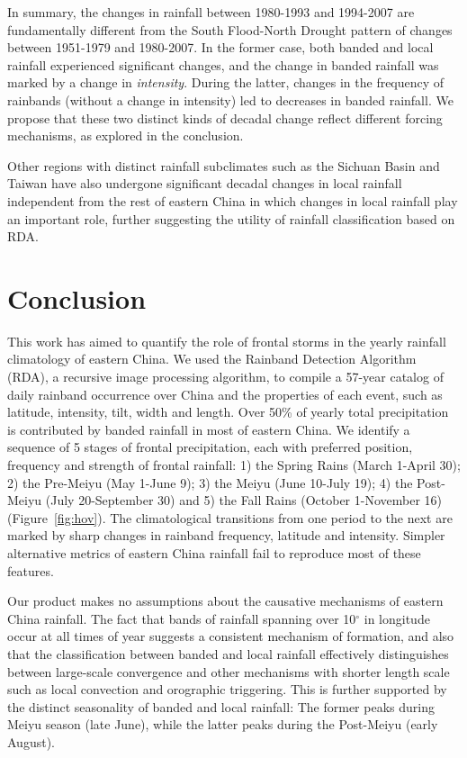 \documentclass[9pt,twocolumn,twoside,lineno]{pnas-new}
\begin{document}
	In summary, the changes in rainfall between 1980-1993 and 1994-2007 are fundamentally different from the South Flood-North Drought pattern of changes between 1951-1979 and 1980-2007. In the former case, both banded and local rainfall experienced significant changes, and the change in banded rainfall was marked by a change in \textit{intensity}. During the latter, changes in the frequency of rainbands (without a change in intensity) led to decreases in banded rainfall. We propose that these two distinct kinds of decadal change reflect different forcing mechanisms, as explored in the conclusion.
	
	Other regions with distinct rainfall subclimates such as the Sichuan Basin and Taiwan have also undergone significant decadal changes in local rainfall independent from the rest of eastern China in which changes in local rainfall play an important role, further suggesting the utility of rainfall classification based on RDA.
	
\section{Conclusion}

	This work has aimed to quantify the role of frontal storms in the yearly rainfall climatology of eastern China. We used the Rainband Detection Algorithm (RDA), a recursive image processing algorithm, to compile a 57-year catalog of daily rainband occurrence over China and the properties of each event, such as latitude, intensity, tilt, width and length. Over 50\% of yearly total precipitation is contributed by banded rainfall in most of eastern China. We identify a sequence of 5 stages of frontal precipitation, each with preferred position, frequency and strength of frontal rainfall: 1) the Spring Rains (March 1-April 30); 2) the Pre-Meiyu (May 1-June 9); 3) the Meiyu (June 10-July 19); 4) the Post-Meiyu (July 20-September 30) and 5) the Fall Rains (October 1-November 16) (Figure~\ref{fig:hov}). The climatological transitions from one period to the next are marked by sharp changes in rainband frequency, latitude and intensity. Simpler alternative metrics of eastern China rainfall fail to reproduce most of these features.
	
	Our product makes no assumptions about the causative mechanisms of eastern China rainfall. The fact that bands of rainfall spanning over 10$^{\circ}$ in longitude occur at all times of year suggests a consistent mechanism of formation, and also that the classification between banded and local rainfall effectively distinguishes between large-scale convergence and other mechanisms with shorter length scale such as local convection and orographic triggering. This is further supported by the distinct seasonality of banded and local rainfall: The former peaks during Meiyu season (late June), while the latter peaks during the Post-Meiyu (early August).
	
\end{document}
